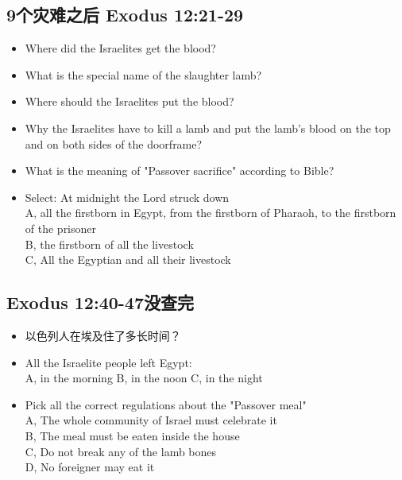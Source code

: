 \subsection{9个灾难之后 Exodus 12:21-29}
\large
\begin{itemize}
\item Where did the Israelites get the blood?
\item What is the special name of the slaughter lamb?
\item Where should the Israelites put the blood?
\item Why the Israelites have to kill a lamb and put the lamb's blood on the top and on both sides of the doorframe?
\item What is the meaning of "Passover sacrifice" according to Bible?
\item Select: At midnight the Lord struck down\\
A, all the firstborn in Egypt, from the firstborn of Pharaoh, to the firstborn of the prisoner\\
B, the firstborn of all the livestock\\
C, All the Egyptian and all their livestock
\end{itemize}

\newpage
\subsection{Exodus 12:40-47没查完}
\large
\begin{itemize}
\item 以色列人在埃及住了多长时间？
\item All the Israelite people left Egypt: \\
A, in the morning \hspace{1cm}  B, in the noon \hspace{1cm}       C, in the night 
\item Pick all the correct regulations about the "Passover meal"\\
A, The whole community of Israel must celebrate it\\
B, The meal must be eaten inside the house\\
C, Do not break any of the lamb bones\\
D, No foreigner may eat it\\
\end{itemize}


